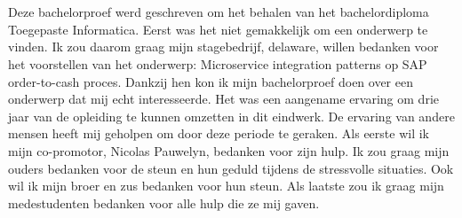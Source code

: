 
\chapter*{}
\label{ch:voorwoord}

Deze bachelorproef werd geschreven om het behalen van het bachelordiploma Toegepaste Informatica. Eerst was het niet gemakkelijk om een onderwerp te vinden. Ik zou daarom graag mijn stagebedrijf, delaware, willen bedanken voor het voorstellen van het onderwerp: Microservice integration patterns op SAP order-to-cash proces. Dankzij hen kon ik mijn bachelorproef doen over een onderwerp dat mij echt interesseerde. Het was een aangename ervaring om drie jaar van de opleiding te kunnen omzetten in dit eindwerk. De ervaring van andere mensen heeft mij geholpen om door deze periode te geraken.
Als eerste wil ik mijn co-promotor, Nicolas Pauwelyn, bedanken voor zijn hulp.
Ik zou graag mijn ouders bedanken voor de steun en hun geduld tijdens de stressvolle situaties. Ook wil ik mijn broer en zus bedanken voor hun steun.
Als laatste zou ik graag mijn medestudenten bedanken voor alle hulp die ze mij gaven. 
